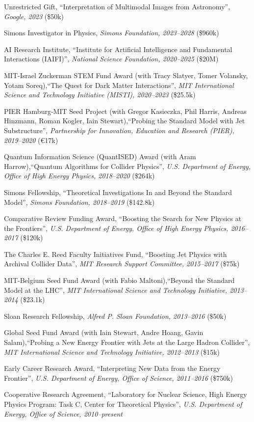 \bbl
\item Unrestricted Gift, ``Interpretation of Multimodal Images from Astronomy'', \textit{Google, 2023}
(\$50k)
\item Simons Investigator in Physics, \textit{Simons Foundation, 2023--2028}
(\$960k)
\item AI Research Institute, ``Institute for Artificial Intelligence and Fundamental Interactions (IAIFI)'', \textit{National Science Foundation, 2020--2025}
(\$20M)
\item MIT-Israel Zuckerman STEM Fund Award (with Tracy Slatyer, Tomer Volansky, Yotam Soreq),``The Quest for Dark Matter Interactions'', \textit{MIT International Science and Technology Initiative (MISTI), 2020--2023}
(\$25.5k)
\item PIER Hamburg-MIT Seed Project (with Gregor Kasieczka, Phil Harris, Andreas Hinzmann, Roman Kogler, Iain Stewart),``Probing the Standard Model with Jet Substructure'', \textit{Partnership for Innovation, Education and Research (PIER), 2019--2020}
(\euro17k)
\item Quantum Information Science (QuantISED) Award (with Aram Harrow),``Quantum Algorithms for Collider Physics'', \textit{U.S. Department of Energy, Office of High Energy Physics, 2018--2020}
(\$264k)
\item Simons Fellowship, ``Theoretical Investigations In and Beyond the Standard Model'', \textit{Simons Foundation, 2018--2019}
(\$142.8k)
\item Comparative Review Funding Award, ``Boosting the Search for New Physics at the Frontiers'', \textit{U.S. Department of Energy, Office of High Energy Physics, 2016--2017}
(\$120k)
\item The Charles E. Reed Faculty Initiatives Fund, ``Boosting Jet Physics with Archival Collider Data'', \textit{MIT Research Support Committee, 2015--2017}
(\$75k)
\item MIT-Belgium Seed Fund Award (with Fabio Maltoni),``Beyond the Standard Model at the LHC'', \textit{MIT International Science and Technology Initiative, 2013--2014}
(\$23.1k)
\item Sloan Research Fellowship, \textit{Alfred P. Sloan Foundation, 2013--2016}
(\$50k)
\item Global Seed Fund Award (with Iain Stewart, Andre Hoang, Gavin Salam),``Probing a New Energy Frontier with Jets at the Large Hadron Collider'', \textit{MIT International Science and Technology Initiative, 2012--2013}
(\$15k)
\item Early Career Research Award, ``Interpreting New Data from the Energy Frontier'', \textit{U.S. Department of Energy, Office of Science, 2011--2016}
(\$750k)
\item Cooperative Research Agreement, ``Laboratory for Nuclear Science, High Energy Physics Program: Task C, Center for Theoretical Physics'', \textit{U.S. Department of Energy, Office of Science, 2010--present}

\el
